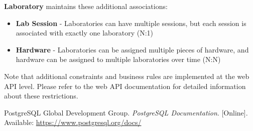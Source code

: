 \documentclass[a4paper,twoside,11pt]{article}
\begin{document}
\textbf{Laboratory} maintains these additional associations:
\begin{itemize}
    \item \textbf{Lab Session} - Laboratories can have multiple sessions, but each session is associated with exactly one laboratory (N:1)
    \item \textbf{Hardware} - Laboratories can be assigned multiple pieces of hardware, and hardware can be assigned to multiple laboratories over time (N:N)
\end{itemize}

Note that additional constraints and business rules are implemented at the web API level. Please refer to the web API documentation for detailed information about these restrictions.


\renewcommand{\refname}{\section{Bibliography}}
\begin{thebibliography}{1}
 PostgreSQL Global Development Group. \textit{PostgreSQL Documentation}. [Online]. Available: \url{https://www.postgresql.org/docs/}
\end{thebibliography}
\end{document}
